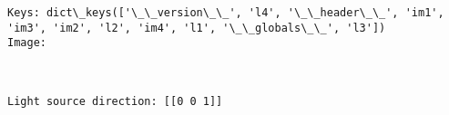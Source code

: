 \documentclass[11pt]{article}
\begin{document}
    \begin{Verbatim}[commandchars=\\\{\}]
Keys: dict\_keys(['\_\_version\_\_', 'l4', '\_\_header\_\_', 'im1', 'im3', 'im2', 'l2', 'im4', 'l1', '\_\_globals\_\_', 'l3'])
Image:

    \end{Verbatim}

    \begin{center}
    \end{center}
    { \hspace*{\fill} \\}
    
    \begin{Verbatim}[commandchars=\\\{\}]
Light source direction: [[0 0 1]]

    \end{Verbatim}
\end{document}
